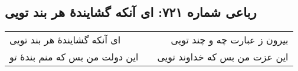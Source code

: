 \begin{center}
\section*{رباعی شماره ۷۲۱: ای آنکه گشایندهٔ هر بند تویی}
\label{sec:sh721}
\begin{longtable}{l p{0.5cm} r}
ای آنکه گشایندهٔ هر بند تویی
&&
بیرون ز عبارت چه و چند تویی
\\
این دولت من بس که منم بندهٔ تو
&&
این عزت من بس که خداوند تویی
\\
\end{longtable}
\end{center}
